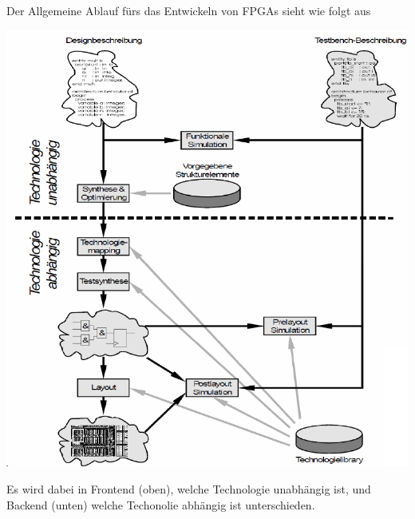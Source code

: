 Der Allgemeine Ablauf fürs das Entwickeln von FPGAs sieht wie folgt aus
\begin{center}
	\includegraphics[width=\columnwidth]{Images/ablauf}
\end{center}
Es wird dabei in Frontend (oben), welche Technologie unabhängig ist, und Backend (unten) welche Techonolie abhängig ist unterschieden.